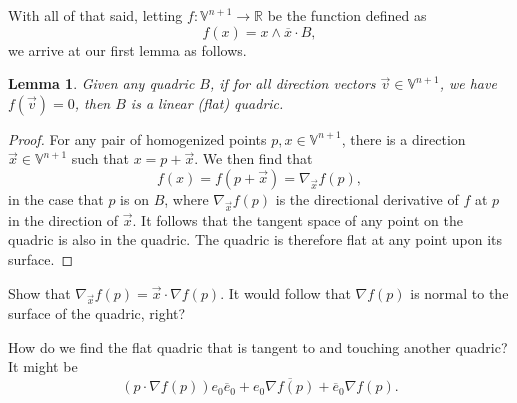 \documentclass{ecgd-l}
\newtheorem{lemma}[theorem]{Lemma}
\theoremstyle{definition}
\theoremstyle{remark}
\numberwithin{equation}{section}
\newcommand{\V}{\mathbb{V}}
\newcommand{\R}{\mathbb{R}}
\begin{document}
With all of that said, letting $f:\V^{n+1}\to\R$ be the function defined as
\begin{equation}
f(x) = x\wedge\overline{x}\cdot B,
\end{equation}
we arrive at our first lemma as follows.
\begin{lemma}
Given any quadric $B$, if for all direction vectors $\vec{v}\in\V^{n+1}$,
we have $f(\vec{v})=0$, then $B$ is a linear (flat) quadric.
\end{lemma}
\begin{proof}
For any pair of homogenized points $p,x\in\V^{n+1}$, there is a direction $\vec{x}\in\V^{n+1}$
such that $x=p+\vec{x}$.  We then find that
\begin{equation}
f(x) = f(p+\vec{x}) = \nabla_{\vec{x}}f(p),
\end{equation}
in the case that $p$ is on $B$, where $\nabla_{\vec{x}}f(p)$ is the directional
derivative of $f$ at $p$ in the direction of $\vec{x}$.  It follows that the tangent
space of any point on the quadric is also in the quadric.  The quadric is therefore
flat at any point upon its surface.
\end{proof}

Show that $\nabla_{\vec{x}}f(p)=\vec{x}\cdot\nabla f(p)$.  It would follow that
$\nabla f(p)$ is normal to the surface of the quadric, right?

How do we find the flat quadric that is tangent to and touching another quadric?
It might be
\begin{equation}
(p\cdot\nabla f(p))e_0\overline{e}_0 + e_0\overline{\nabla f(p)}+\overline{e}_0\nabla f(p).
\end{equation}




\end{document}
